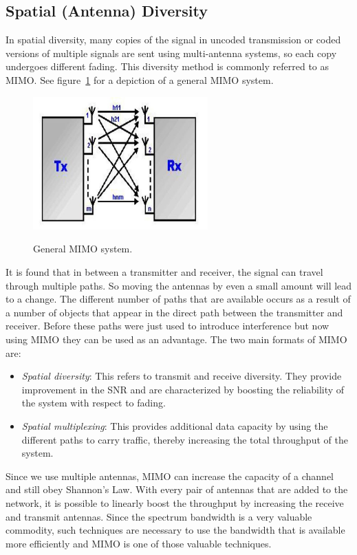 \subsection{Spatial (Antenna) Diversity}
In spatial diversity, many copies of the signal in uncoded transmission or coded versions of multiple signals are sent using multi-antenna systems, so each copy undergoes different fading. This diversity method is commonly referred to as MIMO. See figure~\ref{fig:mimo} for a depiction of a general MIMO system.

\begin{figure}
\centering
\includegraphics[width=0.6\textwidth]{images/MIMO_System.jpg}
\label{fig:mimo}
\caption{General MIMO system.}
\end{figure}

It is found that in between a transmitter and receiver, the signal can travel through multiple paths. So moving the antennas by even a small amount will lead to a change. The different number of paths that are available occurs as a result of a number of objects that appear in the direct path between the transmitter and receiver. Before these paths were just used to introduce interference but now using MIMO they can be used as an advantage. The two main formats of MIMO are: 
\begin{itemize}
\item \emph{Spatial diversity}: This refers to transmit and receive diversity. They provide improvement in the SNR and are characterized by boosting the reliability of the system with respect to fading. 
\item \emph{Spatial multiplexing}: This provides additional data capacity by using the different paths to carry traffic, thereby increasing the total throughput of the system. 
\end{itemize}
Since we use multiple antennas, MIMO can increase the capacity of a channel and still obey Shannon’s Law. With every pair of antennas that are added to the network, it is possible to linearly boost the throughput by increasing the receive and transmit antennas. Since the spectrum bandwidth is a very valuable commodity, such techniques are necessary to use the bandwidth that is available more efficiently and MIMO is one of those valuable techniques.

